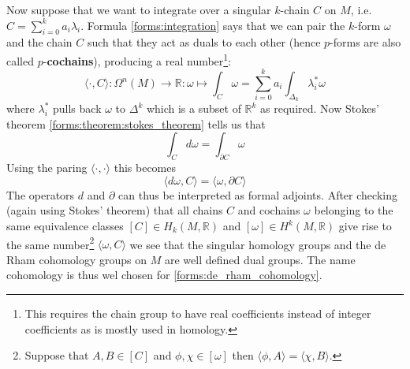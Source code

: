 	Now suppose that we want to integrate over a singular $k$-chain $C$ on $M$, i.e. $C = \sum_{i=0}^ka_i\lambda_i$. Formula \ref{forms:integration} says that we can pair the $k$-form $\omega$ and the chain $C$ such that they act as duals to each other (hence $p$-forms are also called $p$-\textbf{cochains}), producing a real number\footnote{This requires the chain group to have real coefficients instead of integer coefficients as is mostly used in homology.}:
	\begin{equation}
		\langle\cdot,C\rangle:\Omega^n(M)\rightarrow\mathbb{R}:\omega\mapsto\int_C\omega = \sum_{i=0}^ka_i\int_{\Delta_k}\lambda_i^{*}\omega
	\end{equation}
	where $\lambda_i^*$ pulls back $\omega$ to $\Delta^k$ which is a subset of $\mathbb{R}^k$ as required. Now Stokes' theorem \ref{forms:theorem:stokes_theorem} tells us that
	\begin{equation}
		\int_Cd\omega = \int_{\partial C}\omega
	\end{equation}
	Using the paring $\langle\cdot,\cdot\rangle$ this becomes
	\begin{equation}
		\langle d\omega, C\rangle = \langle \omega, \partial C\rangle
	\end{equation}
	The operators $d$ and $\partial$ can thus be interpreted as formal adjoints. After checking (again using Stokes' theorem) that all chains $C$ and cochains $\omega$ belonging to the same equivalence classes $[C]\in H_k(M, \mathbb{R})$ and $[\omega]\in H^k(M, \mathbb{R})$ give rise to the same number\footnote{Suppose that $A, B\in [C]$ and $\phi, \chi\in[\omega]$ then $\langle \phi, A \rangle = \langle \chi, B \rangle$.} $\langle\omega, C\rangle$ we see that the singular homology groups and the de Rham cohomology groups on $M$ are well defined dual groups. The name cohomology is thus wel chosen for \ref{forms:de_rham_cohomology}.
